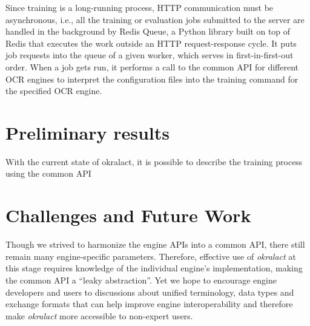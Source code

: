 \documentclass[conference]{IEEEtran}
\begin{document}

Since training is a long-running process, HTTP communication must be asynchronous,
i.e., all the training or evaluation
jobs submitted to the server are handled in the background by Redis Queue,
a Python library built on top of Redis that
executes the work outside an HTTP request-response cycle. It puts job
requests into the queue of a given worker, which serves in
first-in-first-out order. When a job gets run, it performs a call to the common
API for different OCR engines to interpret the configuration files into the
training command for the specified OCR engine.




\section{Preliminary results}

With the current state of okralact, it is possible to describe the training process
using the common API



\section{Challenges and Future Work}



Though we strived to harmonize the engine APIs into a common API,
there still remain many engine-specific parameters. Therefore,
effective use of \textit{okralact} at this stage requires knowledge
of the individual engine's implementation, making the common API a
``leaky abstraction''. Yet we hope to encourage engine developers and
users to discussions about unified
terminology, data types and exchange formats that can help improve engine
interoperability and therefore make \textit{okralact} more
accessible to non-expert users.
\end{document}
